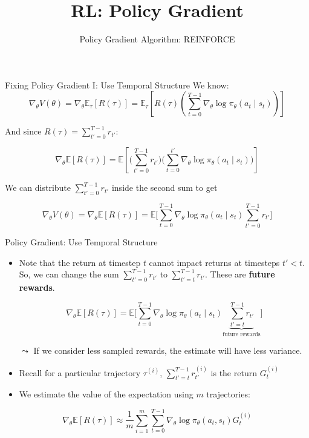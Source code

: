 \documentclass[aspectratio=169]{../latex_main/tntbeamer}  %
\title[RL: Policy Gradient]{RL: Policy Gradient}
\subtitle{Policy Gradient Algorithm: REINFORCE}
\begin{document}
	
	\maketitle

\begin{frame}[c]{Fixing Policy Gradient I: Use Temporal Structure}
\vspace{-1.5em}
We know:
$$ \nabla_\theta V(\theta) = \nabla_\theta \mathbb{E}_\tau [R(\tau)] = \mathbb{E}_\tau \left[ R(\tau) \left( \sum_{t=0}^{T-1} \nabla_\theta \log \pi_\theta(a_t \mid s_t) \right) \right]$$
	
And since $R(\tau) = \sum_{t'=0}^{T-1} r_{t'}$:

$$
     \nabla_\theta \mathbb{E}[R(\tau)] = \mathbb{E} \left[  \bigg ( \sum_{t'=0}^{T-1} r_{t'} \bigg ) \bigg ( \sum^{t'}_{t=0} \nabla_\theta \log \pi_\theta (a_t \mid s_t) \bigg )  \right]
$$

We can distribute $\sum_{t'=0}^{T-1} r_{t'}$ inside the second sum to get

$$
    \nabla_\theta V(\theta) = \nabla_\theta \mathbb{E}[R(\tau)] = \mathbb{E} \bigg [ \sum_{t=0}^{T-1}  \nabla_\theta \log \pi_\theta (a_t \mid s_t) \sum^{T-1}_{t'=0} r_{t'}  \bigg ]
$$

	
\end{frame}
\begin{frame}[c]{Policy Gradient: Use Temporal Structure}
	
\begin{itemize}
        \item Note that the return at timestep $t$ cannot impact returns at timesteps $t' < t$. So, we can change the sum $\sum_{t'=0}^{T-1} r_{t'}$ to $\sum_{t'=t}^{T-1} r_{t'}$. These are \textbf{future rewards}.

        $$
             \nabla_\theta \mathbb{E}[R(\tau)] = \mathbb{E} \bigg [ \sum_{t=0}^{T-1}  \nabla_\theta \log \pi_\theta (a_t \mid s_t) \underbrace{\sum^{T-1}_{t'=t} r_{t'} }_{\text{future rewards}} \bigg ]
        $$

        \item[$\leadsto$] If we consider less sampled rewards, the estimate will have less variance.
	\item Recall for a particular trajectory $\tau^{(i)}$, $\sum_{t'=t}^{T-1} r_{t'}^{(i)}$ is the return $G_t^{(i)}$
    \item We estimate the value of the expectation using $m$ trajectories:
\end{itemize}

$$\nabla_\theta \mathbb{E}[R(\tau)] \approx \frac{1}{m} \sum_{i=1}^m \sum_{t=0}^{T-1} \nabla_\theta \log \pi_\theta (a_t,s_t) G_t^{(i)} $$

	
\end{frame}
\end{document}
